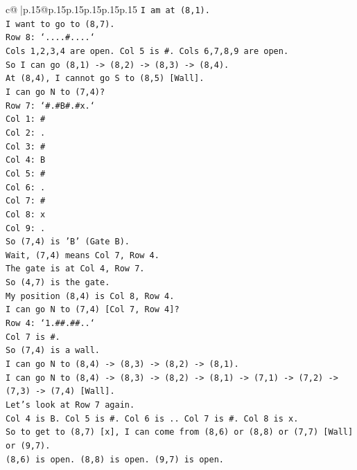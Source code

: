 \documentclass{article}
\begin{document}
{\begin{supertabular}{c@{$\;$}|p{.15\linewidth}@{}p{.15\linewidth}p{.15\linewidth}p{.15\linewidth}p{.15\linewidth}p{.15\linewidth}}
{{{\texttt{I am at (8,1).} \\
\texttt{I want to go to (8,7).} \\
\texttt{Row 8: `....\#....`} \\
\texttt{Cols 1,2,3,4 are open. Col 5 is \#. Cols 6,7,8,9 are open.} \\
\texttt{So I can go (8,1) {-}> (8,2) {-}> (8,3) {-}> (8,4).} \\
\texttt{At (8,4), I cannot go S to (8,5) {[}Wall{]}.} \\
\texttt{I can go N to (7,4)?} \\
\texttt{Row 7: `\#.\#B\#.\#x.`} \\
\texttt{Col 1: \#} \\
\texttt{Col 2: .} \\
\texttt{Col 3: \#} \\
\texttt{Col 4: B} \\
\texttt{Col 5: \#} \\
\texttt{Col 6: .} \\
\texttt{Col 7: \#} \\
\texttt{Col 8: x} \\
\texttt{Col 9: .} \\
\texttt{So (7,4) is 'B' (Gate B).} \\
\texttt{Wait, (7,4) means Col 7, Row 4.} \\
\texttt{The gate is at Col 4, Row 7.} \\
\texttt{So (4,7) is the gate.} \\
\texttt{My position (8,4) is Col 8, Row 4.} \\
\texttt{I can go N to (7,4) {[}Col 7, Row 4{]}?} \\
\texttt{Row 4: `1.\#\#.\#\#..`} \\
\texttt{Col 7 is \#.} \\
\texttt{So (7,4) is a wall.} \\
\texttt{I can go N to (8,4) {-}> (8,3) {-}> (8,2) {-}> (8,1).} \\
\texttt{I can go N to (8,4) {-}> (8,3) {-}> (8,2) {-}> (8,1) {-}> (7,1) {-}> (7,2) {-}> (7,3) {-}> (7,4) {[}Wall{]}.} \\
\texttt{Let's look at Row 7 again.} \\
\texttt{Col 4 is B. Col 5 is \#. Col 6 is .. Col 7 is \#. Col 8 is x.} \\
\texttt{So to get to (8,7) {[}x{]}, I can come from (8,6) or (8,8) or (7,7) {[}Wall{]} or (9,7).} \\
\texttt{(8,6) is open. (8,8) is open. (9,7) is open.} \\
}}}
\end{supertabular}}
\end{document}
